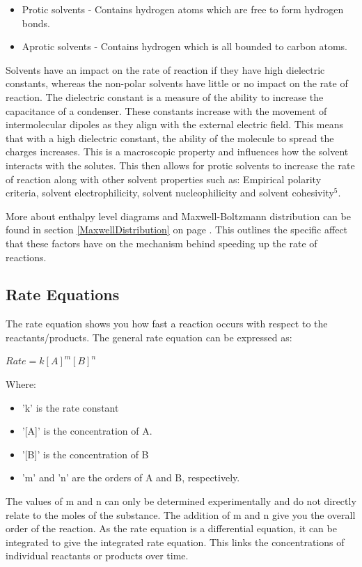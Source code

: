 \begin{itemize}
\item Protic solvents - Contains hydrogen atoms which are free to form hydrogen bonds.
\item Aprotic solvents - Contains hydrogen which is all bounded to carbon atoms.
\end{itemize}

Solvents have an impact on the  rate of reaction if they have high dielectric constants, whereas the non-polar solvents have little or no impact on the rate of reaction. The dielectric constant is a measure of the ability to increase the capacitance of a condenser. These constants increase with the movement of intermolecular dipoles as they align with the external electric field. This means that with a high dielectric constant, the ability of the molecule to spread the charges increases. This is a macroscopic property and influences how the solvent interacts with the solutes. This then allows for protic solvents to increase the rate of reaction along with other solvent properties such as: Empirical polarity criteria, solvent electrophilicity, solvent nucleophilicity and solvent cohesivity$^5$.

More about enthalpy level diagrams and Maxwell-Boltzmann distribution can be found in section \ref{MaxwellDistribution} on page \pageref{MaxwellDistribution}. This outlines the specific affect that these factors have on the mechanism behind speeding up the rate of reactions. 

	\subsection{Rate Equations} %

The rate equation shows you how fast a reaction occurs with respect to the reactants/products. The general rate equation can be expressed as:

$Rate = k[A]^m [B]^n$

Where:
\begin{itemize}
\item 'k' is the rate constant
\item '[A]' is the concentration of A.
\item '[B]' is the concentration of B
\item 'm' and 'n' are the orders of A and B, respectively.
\end{itemize}


The values of m and n can only be determined experimentally and do not directly relate to the moles of the substance. The addition of m and n give you the overall order of the reaction. As the rate equation is a differential equation, it can be integrated to give the integrated rate equation. This links the concentrations of individual reactants or products over time. 


